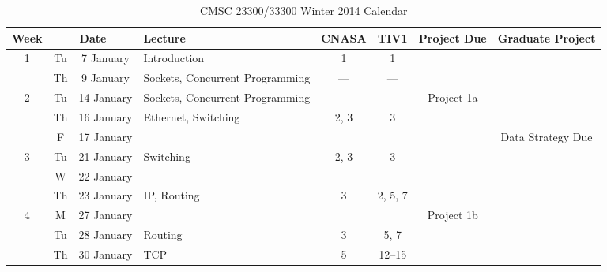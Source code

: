 \documentclass[11pt]{article}
\begin{document}
\begin{sidewaystable}
\sffamily
\setlength{\extrarowheight}{4pt}
\caption{CMSC 23300/33300 Winter 2014 Calendar}
\begin{tabular}{|c|cc||p{6cm}|c|c|c|c|}
\hline
\textbf{Week} &  \multicolumn{2}{|c||}{\textbf{Date}} & \textbf{Lecture} & \textbf{CNASA} & \textbf{TIV1} & \textbf{Project Due} & \textbf{Graduate Project} \\\hline

\multirow{2}{*}{1}  & Tu & 7 January    & Introduction                                    & 1    & 1       & \cellcolor[gray]{0.9}  & \cellcolor[gray]{0.9} \\\cline{2-6}
                    & Th & 9 January    & Sockets, Concurrent Programming                 & ---  & ---     & \cellcolor[gray]{0.9}  & \cellcolor[gray]{0.9} \\\hline\hline

\multirow{3}{*}{2}  & Tu & 14 January   & Sockets, Concurrent Programming                 & ---  & ---     & Project 1a  & \cellcolor[gray]{0.9} \\\cline{2-6}
                    & Th & 16 January   & Ethernet, Switching                             & 2, 3 & 3       & \cellcolor[gray]{0.9} & \cellcolor[gray]{0.9} \\\hline\hline
                    & F  & 17 January   & \cellcolor[gray]{0.9} & \cellcolor[gray]{0.9} & \cellcolor[gray]{0.9} &  \cellcolor[gray]{0.9} & Data Strategy Due\\\hline\hline

\multirow{3}{*}{3}  & Tu & 21 January   & Switching                                       & 2, 3 & 3       & \cellcolor[gray]{0.9}  & \cellcolor[gray]{0.9} \\\cline{2-6}
                    & W  & 22 January   & \cellcolor[gray]{0.9} & \cellcolor[gray]{0.9} & \cellcolor[gray]{0.9} & \cellcolor[gray]{0.9} & \cellcolor[gray]{0.9} \\\cline{2-6}
                    & Th & 23 January   & IP, Routing                                     & 3    & 2, 5, 7 & \cellcolor[gray]{0.9}  & \cellcolor[gray]{0.9} \\\hline\hline

\multirow{3}{*}{4}  & M  & 27 January   & \cellcolor[gray]{0.9} & \cellcolor[gray]{0.9} & \cellcolor[gray]{0.9} &  Project 1b & \cellcolor[gray]{0.9} \\\cline{2-6}
                    & Tu & 28 January   & Routing                                         & 3    & 5, 7    & \cellcolor[gray]{0.9}  & \cellcolor[gray]{0.9} \\\cline{2-6}
                    & Th & 30 January   & TCP                                             & 5    & 12--15  & \cellcolor[gray]{0.9}  & \cellcolor[gray]{0.9} \\\hline\hline


\end{tabular}
\end{sidewaystable}
\end{document}
